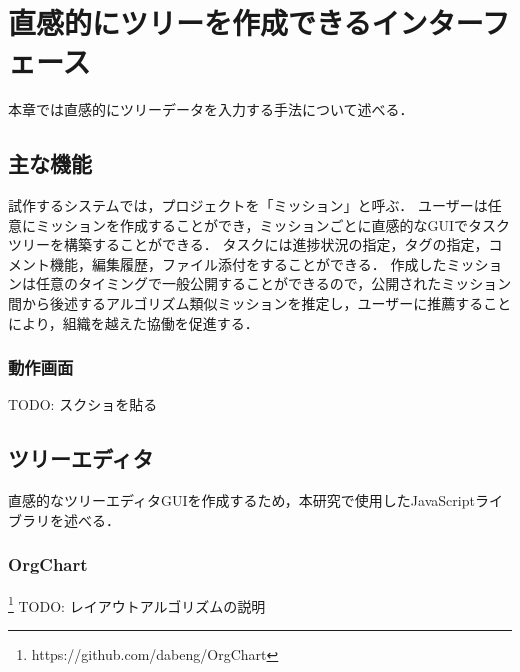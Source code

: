 \chapter{直感的にツリーを作成できるインターフェース}
本章では直感的にツリーデータを入力する手法について述べる．

\section{主な機能}
試作するシステムでは，プロジェクトを「ミッション」と呼ぶ．
ユーザーは任意にミッションを作成することができ，ミッションごとに直感的なGUIでタスクツリーを構築することができる．
タスクには進捗状況の指定，タグの指定，コメント機能，編集履歴，ファイル添付をすることができる．
作成したミッションは任意のタイミングで一般公開することができるので，公開されたミッション間から後述するアルゴリズム類似ミッションを推定し，ユーザーに推薦することにより，組織を越えた協働を促進する．

\subsection{動作画面}
TODO: スクショを貼る

\section{ツリーエディタ}
直感的なツリーエディタGUIを作成するため，本研究で使用したJavaScriptライブラリを述べる．

\subsection{OrgChart}
\footnote{https://github.com/dabeng/OrgChart}
TODO: レイアウトアルゴリズムの説明
